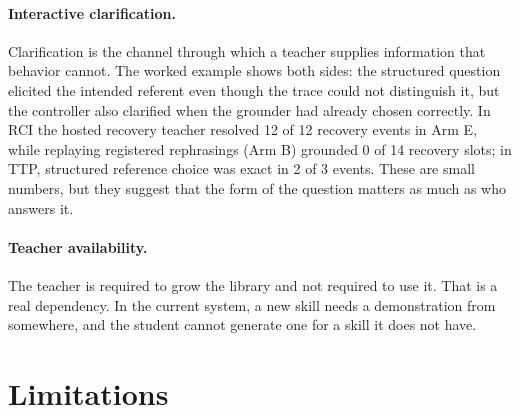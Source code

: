 \documentclass[10pt]{article}
\begin{document}
\paragraph{Interactive clarification.} Clarification is the channel through which a teacher supplies information that behavior cannot. The worked example shows both sides: the structured question elicited the intended referent even though the trace could not distinguish it, but the controller also clarified when the grounder had already chosen correctly. In RCI the hosted recovery teacher resolved 12 of 12 recovery events in Arm E, while replaying registered rephrasings (Arm B) grounded 0 of 14 recovery slots; in TTP, structured reference choice was exact in 2 of 3 events. These are small numbers, but they suggest that the form of the question matters as much as who answers it.

\paragraph{Teacher availability.} The teacher is required to grow the library and not required to use it. That is a real dependency. In the current system, a new skill needs a demonstration from somewhere, and the student cannot generate one for a skill it does not have.

\section{Limitations}\label{sec:limitations}
\end{document}
